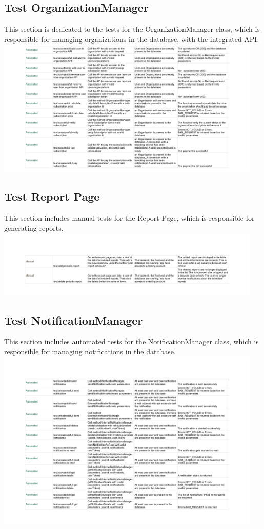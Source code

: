\documentclass{article}
\begin{document}
\subsection*{Test OrganizationManager}
This section is dedicated to the tests for the OrganizationManager class, which is responsible for managing organizations in the database, with the integrated API.
\newline
\includegraphics[width=0.95\textwidth]{images/Test_OrganizationManager.jpg}

\subsection*{Test Report Page}
This section includes manual tests for the Report Page, which is responsible for generating reports.
\newline
\includegraphics[width=0.95\textwidth]{images/Test_ReportPage.jpg}
\subsection*{Test NotificationManager}
This section includes automated tests for the NotificationManager class, which is responsible for managing notifications in the database.
\newline
\includegraphics[width=0.95\textwidth]{images/Test_NotificationManager.jpg}
\end{document}
